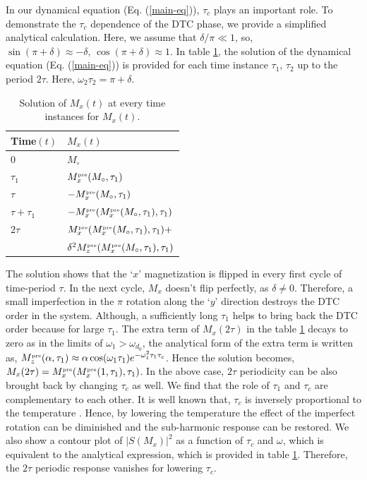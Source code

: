 \documentclass[prl,aps,preprint,floatfix]{revtex4-2}
\begin{document}
In our dynamical equation (Eq. (\ref{main-eq})), $\tau_c$ plays an important role. To demonstrate the $\tau_c$ dependence of the DTC phase, we provide a simplified analytical calculation. Here, we assume that $\delta/ \pi \ll 1 $, so, $\sin(\pi +\delta) \approx -\delta, \, \cos(\pi +\delta)  \approx 1$. In table \ref{table-1}, the solution of the dynamical equation (Eq. (\ref{main-eq})) is provided for each time instance $\tau_1, \, \tau_2$ up to the period $2\tau$. Here, $\omega_2 \tau_2 = \pi + \delta$.
\begin{table}[htb]
\begin{center}
\caption{Solution of $M_x (t)$ at every time instances for $M_x (t)$.}
\begin{tabular}{ p{1.5cm} |p{4.5cm}    }
 Time$(t)$& $M_x (t)$\\
 \hline
 \hline
 $0$ & $M_{\circ}$\\
 $\tau_1$  &  $M_x^{\scriptscriptstyle \rm pre}(M_\circ,\tau_1)$    \\
 $\tau $  & $-M_x^{\scriptscriptstyle \rm pre}(M_\circ,\tau_1)$     \\
 $\tau + \tau_1$  &  $-M_x^{\scriptscriptstyle \rm pre}(M_x^{\scriptscriptstyle \rm pre}(M_{\circ}, \tau_1), \tau_1)$    \\
 $2\tau$  &  $ M_x^{\scriptscriptstyle \rm pre}(M_x^{\scriptscriptstyle \rm pre}(M_{\circ}, \tau_1), \tau_1) +$    \\
 &   $\delta^2 M_z^{\scriptscriptstyle \rm pre}(M_x^{\scriptscriptstyle \rm pre}(M_{\circ}, \tau_1), \tau_1)$ \\
 \hline
  \end{tabular}
\label{table-1}
\end{center}
\end{table} 
The solution shows that the `$x$' magnetization is flipped in every first cycle of time-period $\tau$. In the next cycle, $M_x$ doesn't flip perfectly, as $\delta \neq 0$. Therefore, a small imperfection in the $\pi$ rotation along the `$y$' direction destroys the DTC order in the system. Although, a sufficiently long $\tau_1$ helps to bring back the DTC order because for large $\tau_1$. The extra term of $M_x (2\tau)$ in the table \ref{table-1} decays to zero as in the limits of $\omega_1> \omega_{d_0}$, the analytical form of the extra term is written as, $M_z^{\scriptscriptstyle \rm pre}(\alpha, \tau_1) \approx \alpha\cos(\omega_1 \tau_1) e^{-\omega_1^2 \tau_1 \tau_c}$. Hence the solution becomes, $M_x (2\tau) = M_x^{\scriptscriptstyle \rm pre}(M_x^{\scriptscriptstyle \rm pre}(1, \tau_1), \tau_1) $.  In the above case, $2\tau$ periodicity can be also brought back by changing $\tau_c$ as well.  We find that the role of $\tau_1$ and $\tau_c$ are complementary to each other. It is well known that, $\tau_c$ is inversely proportional to the temperature \cite{chakrabarti2018a}. Hence, by lowering the temperature the effect of the imperfect rotation can be diminished and the sub-harmonic response can be restored. We also show a contour plot of $\vert S(M_x)\vert^2$ as a function of $\tau_c$ and $\omega$, which is equivalent to the analytical expression, which is provided in table \ref{table-1}. Therefore, the $2\tau$ periodic response vanishes for lowering $\tau_c$. 
\end{document}
